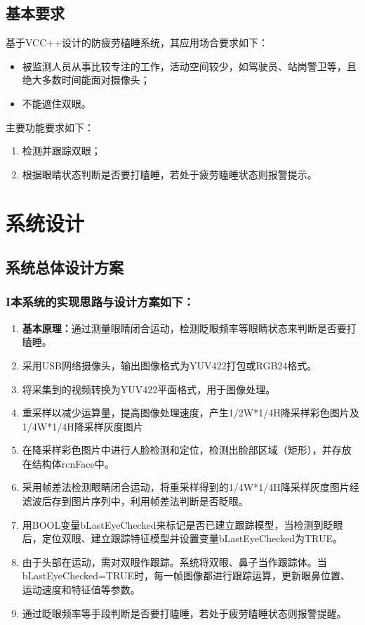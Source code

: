 \documentclass[12pt,hyperref,a4paper,UTF8]{ctexart}
\begin{document}
    \subsection{基本要求}
        基于VCC++设计的防疲劳磕睡系统，其应用场合要求如下：
        \begin{itemize}
            \item 被监测人员从事比较专注的工作，活动空间较少，如驾驶员、站岗警卫等，且绝大多数时间能面对摄像头；
            \item 不能遮住双眼。
        \end{itemize}
        主要功能要求如下：
        \begin{enumerate}
            \item 检测并跟踪双眼；
            \item 根据眼睛状态判断是否要打瞌睡，若处于疲劳瞌睡状态则报警提示。
        \end{enumerate}
\newpage
\section{系统设计}
    \subsection{系统总体设计方案}
        \subsubsection*{I本系统的实现思路与设计方案如下：}
        \begin{enumerate}
            \item \textbf{基本原理：}通过测量眼睛闭合运动，检测眨眼频率等眼睛状态来判断是否要打瞌睡。
            \item 采用USB网络摄像头，输出图像格式为YUV422打包或RGB24格式。
            \item 将采集到的视频转换为YUV422平面格式，用于图像处理。
            \item 重采样以减少运算量，提高图像处理速度，产生1/2W*1/4H降采样彩色图片及1/4W*1/4H降采样灰度图片
            \item 在降采样彩色图片中进行人脸检测和定位，检测出脸部区域（矩形），并存放在结构体rcnFace中。
            \item 采用帧差法检测眼睛闭合运动，将重采样得到的1/4W*1/4H降采样灰度图片经滤波后存到图片序列中，利用帧差法判断是否眨眼。
            \item 用BOOL变量bLastEyeChecked来标记是否已建立跟踪模型，当检测到眨眼后，定位双眼、建立跟踪特征模型并设置变量bLastEyeChecked为TRUE。
            \item 由于头部在运动，需对双眼作跟踪。系统将双眼、鼻子当作跟踪体。当bLastEyeChecked=TRUE时，每一帧图像都进行跟踪运算，更新眼鼻位置、运动速度和特征值等参数。
            \item 通过眨眼频率等手段判断是否要打瞌睡，若处于疲劳瞌睡状态则报警提醒。
        \end{enumerate}
\end{document}
